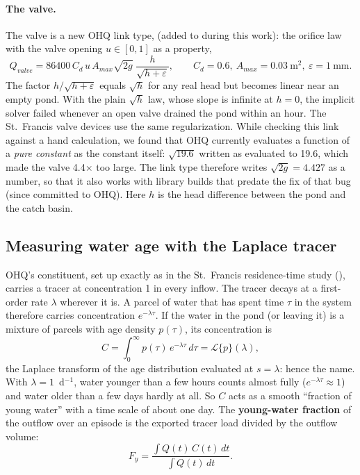 \paragraph{The valve.} The valve is a new OHQ link type,
 (added to 
during this work): the orifice law with the valve opening $u\in[0,1]$ as a
property,
\[
Q_{valve}=86400\,C_d\,u\,A_{max}\sqrt{2g}\;\frac{h}{\sqrt{h+\varepsilon}},
\qquad C_d=0.6,\ A_{max}=0.03~\text{m}^2,\ \varepsilon=1~\text{mm}.
\]
The factor $h/\sqrt{h+\varepsilon}$ equals $\sqrt h$ for any real head but
becomes linear near an empty pond. With the plain $\sqrt h$ law, whose
slope is infinite at $h=0$, the implicit solver failed whenever an open
valve drained the pond within an hour. The St.~Francis valve devices use
the same regularization. While checking this link against a hand
calculation, we found that OHQ currently evaluates a function of a
\emph{pure constant} as the constant itself: $\sqrt{19.6}$ written as
 evaluated to 19.6, which made the valve 4.4$\times$ too
large. The link type therefore writes $\sqrt{2g}=4.427$ as a number, so that it
also works with library builds that predate the fix of that bug (since
committed to OHQ). Here $h$ is the head difference between the pond and the
catch basin.

\subsection{Measuring water age with the Laplace tracer}
OHQ's  constituent, set up exactly as in the
St.~Francis residence-time study (), carries a tracer at
concentration 1 in every inflow. The tracer decays at a first-order rate
$\lambda$ wherever it is. A parcel of water that has spent time $\tau$ in
the system therefore carries concentration $e^{-\lambda\tau}$. If the water
in the pond (or leaving it) is a mixture of parcels with age density
$p(\tau)$, its concentration is
\[
C=\int_0^\infty p(\tau)\,e^{-\lambda\tau}\,d\tau=\mathcal L\{p\}(\lambda),
\]
the Laplace transform of the age distribution evaluated at $s=\lambda$:
hence the name. With $\lambda=1$~d$^{-1}$, water younger than a few hours
counts almost fully ($e^{-\lambda\tau}\approx1$) and water older than a few
days hardly at all. So $C$ acts as a smooth ``fraction of young water'' with
a time scale of about one day. The \textbf{young-water fraction} of the
outflow over an episode is the exported tracer load divided by the outflow
volume:
\[
F_y=\frac{\int Q(t)\,C(t)\,dt}{\int Q(t)\,dt}.
\]

